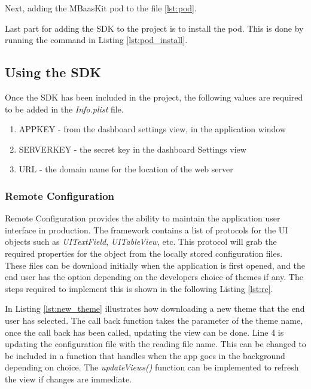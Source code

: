 Next, adding the MBaasKit pod to the file \ref{lst:pod}.



Last part for adding the SDK to the project is to install the pod. This is done by running the command in Listing \ref{lst:pod_install}.



\subsection{Using the SDK}

Once the SDK has been included in the project, the following values are required to be added in the \textit{Info.plist} file.

\begin{enumerate}
  \item APPKEY - from the dashboard settings view, in the application window
  \item SERVERKEY - the secret key in the dashboard Settings view
  \item URL - the domain name for the location of the web server
\end{enumerate}

\subsubsection{Remote Configuration}

Remote Configuration provides the ability to maintain the application user interface in production. The framework contains a list of protocols for the UI objects such as \textit{UITextField}, \textit{UITableView}, etc. This protocol will grab the required properties for the object from the locally stored configuration files. These files can be download initially when the application is first opened, and the end user has the option depending on the developers choice of themes if any. The steps required to implement this is shown in the following Listing \ref{lst:rc}.



In Listing \ref{lst:new_theme} illustrates how downloading a new theme that the end user has selected. The call back function takes the parameter of the theme name, once the call back has been called, updating the view can be done. Line 4 is updating the configuration file with the reading file name. This can be changed to be included in a function that handles when the app goes in the background depending on choice. The \textit{updateViews()} function can be implemented to refresh the view if changes are immediate.

